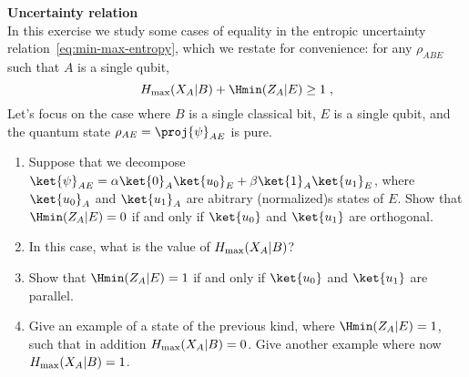 \begin{exercises}
\item {\bf Uncertainty relation}\\
In this exercise we study some cases of equality in the entropic uncertainty relation~\eqref{eq:min-max-entropy}, which we restate for convenience: for any $\rho_{ABE}$ such that $A$ is a single qubit, 
\begin{equation*}
 H_{\rm max}(X_A|B) + \Hmin(Z_A|E) \geq 1\;,
\end{equation*}
Let's focus on the case where $B$ is a single classical bit, $E$ is a single qubit, and the quantum state $\rho_{AE} = \proj{\psi}_{AE}$ is pure. 
\begin{enumerate}
\item Suppose that we decompose $\ket{\psi}_{AE} = \alpha \ket{0}_A\ket{u_0}_E + \beta \ket{1}_A \ket{u_1}_E$, where $\ket{u_0}_A$ and $\ket{u_1}_A$ are abitrary (normalized)s states of $E$. Show that $\Hmin(Z_A|E)=0$ if and only if $\ket{u_0}$ and $\ket{u_1}$ are orthogonal.
\item In this case, what is the value of $H_{\rm max}(X_A|B)$?
\item Show that $\Hmin(Z_A|E)=1$ if and only if $\ket{u_0}$ and $\ket{u_1}$ are parallel.
\item Give an example of a state of the previous kind, where  $\Hmin(Z_A|E)=1$, such that in addition $H_{\rm max}(X_A|B)=0$. Give another example where now $H_{\rm max}(X_A|B)=1$.
\end{enumerate}

\end{exercises}
